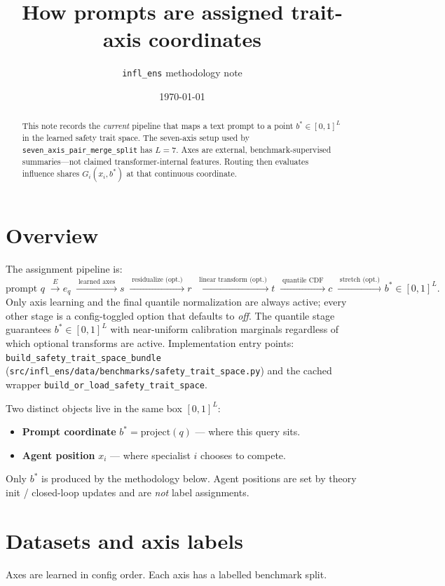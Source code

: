 \documentclass[11pt]{article}
\title{How prompts are assigned trait-axis coordinates}
\author{\texttt{infl\_ens} methodology note}
\date{\today}
\begin{document}
\maketitle

\begin{abstract}
This note records the \emph{current} pipeline that maps a text prompt to a point
\(b^\ast\in[0,1]^L\) in the learned safety trait space. The seven-axis setup used by
\texttt{seven\_axis\_pair\_merge\_split} has \(L=7\). Axes are external,
benchmark-supervised summaries---not claimed transformer-internal features.
Routing then evaluates influence shares \(G_i(x_i,b^\ast)\) at that continuous
coordinate.
\end{abstract}

\section{Overview}
The assignment pipeline is:
\[
\text{prompt }q
\;\xrightarrow{\;E\;}
e_q
\;\xrightarrow{\;\text{learned axes}\;}
s
\;\xrightarrow{\;\text{residualize (opt.)}\;}
r
\;\xrightarrow{\;\text{linear transform (opt.)}\;}
t
\;\xrightarrow{\;\text{quantile CDF}\;}
c
\;\xrightarrow{\;\text{stretch (opt.)}\;}
b^\ast\in[0,1]^L.
\]
Only axis learning and the final quantile normalization are always active;
every other stage is a config-toggled option that defaults to \emph{off}.
The quantile stage guarantees \(b^\ast\in[0,1]^L\) with near-uniform
calibration marginals regardless of which optional transforms are active.
Implementation entry points:
\texttt{build\_safety\_trait\_space\_bundle}
(\texttt{src/infl\_ens/data/benchmarks/safety\_trait\_space.py})
and the cached wrapper
\texttt{build\_or\_load\_safety\_trait\_space}.

Two distinct objects live in the same box \([0,1]^L\):
\begin{itemize}[leftmargin=1.4em]
  \item \textbf{Prompt coordinate} \(b^\ast=\mathrm{project}(q)\) --- where this query sits.
  \item \textbf{Agent position} \(x_i\) --- where specialist \(i\) chooses to compete.
\end{itemize}
Only \(b^\ast\) is produced by the methodology below. Agent positions are set by
theory init / closed-loop updates and are \emph{not} label assignments.

\section{Datasets and axis labels}
Axes are learned in config order. Each axis has a labelled benchmark split.
\end{document}
